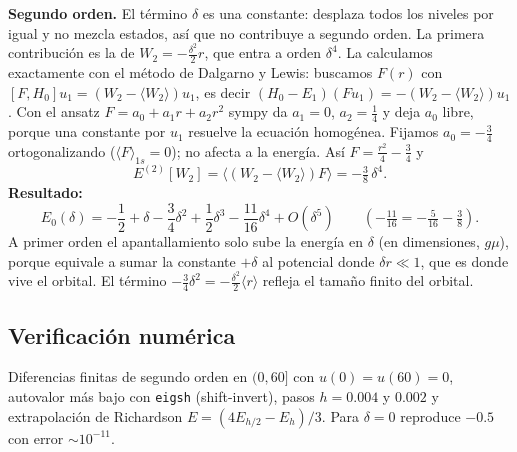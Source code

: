 \documentclass[11pt]{article}
\begin{document}
\textbf{Segundo orden.} El término $\delta$ es una constante: desplaza todos los niveles por igual y no mezcla estados, así que no contribuye a segundo orden. La primera contribución es la de $W_2=-\tfrac{\delta^2}{2}r$, que entra a orden $\delta^4$. La calculamos exactamente con el método de Dalgarno y Lewis: buscamos $F(r)$ con $[F,H_0]u_1=(W_2-\langle W_2\rangle)u_1$, es decir $(H_0-E_1)(Fu_1)=-(W_2-\langle W_2\rangle)u_1$. Con el ansatz $F=a_0+a_1r+a_2r^2$ sympy da $a_1=0$, $a_2=\tfrac14$ y deja $a_0$ libre, porque una constante por $u_1$ resuelve la ecuación homogénea. Fijamos $a_0=-\tfrac34$ ortogonalizando ($\langle F\rangle_{1s}=0$); no afecta a la energía. Así $F=\tfrac{r^2}{4}-\tfrac34$ y
\[
E^{(2)}[W_2]=\langle(W_2-\langle W_2\rangle)F\rangle=-\tfrac38\,\delta^4 .
\]
\textbf{Resultado:}
\[
\boxed{E_0(\delta)=-\frac12+\delta-\frac34\delta^2+\frac12\delta^3-\frac{11}{16}\delta^4+O(\delta^5)}
\qquad\left(-\tfrac{11}{16}=-\tfrac{5}{16}-\tfrac38\right).
\]
A primer orden el apantallamiento solo sube la energía en $\delta$ (en dimensiones, $g\mu$), porque equivale a sumar la constante $+\delta$ al potencial donde $\delta r\ll1$, que es donde vive el orbital. El término $-\tfrac34\delta^2=-\tfrac{\delta^2}{2}\langle r\rangle$ refleja el tamaño finito del orbital.

\subsection{Verificación numérica}

Diferencias finitas de segundo orden en $(0,60]$ con $u(0)=u(60)=0$, autovalor más bajo con \texttt{eigsh} (shift-invert), pasos $h=0.004$ y $0.002$ y extrapolación de Richardson $E=(4E_{h/2}-E_h)/3$. Para $\delta=0$ reproduce $-0.5$ con error $\sim10^{-11}$.
\end{document}
